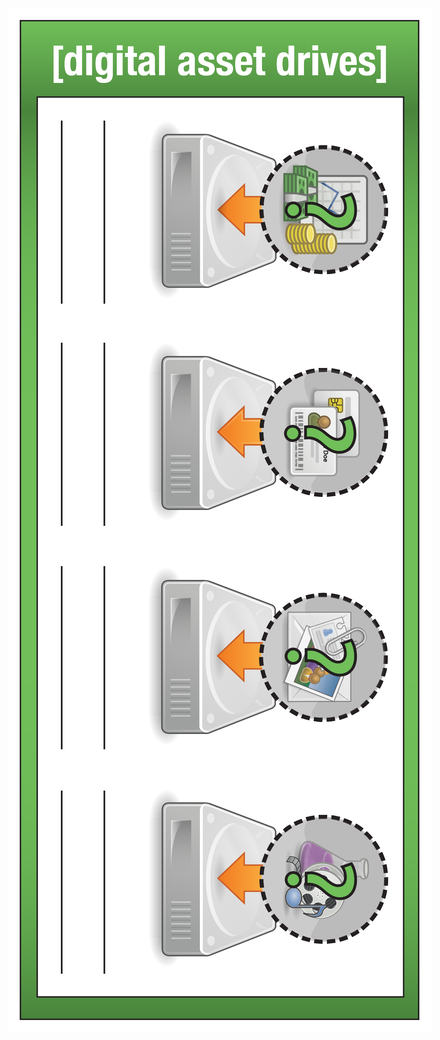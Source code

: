 \documentclass{letter}
\begin{document}
\includegraphics{mats/asset-drive_customizable} \\
\end{document}
